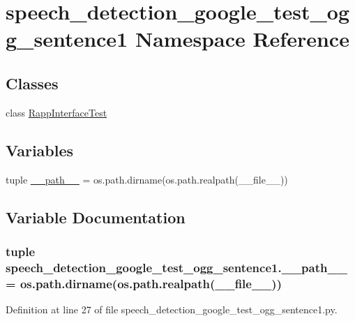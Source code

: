 \hypertarget{namespacespeech__detection__google__test__ogg__sentence1}{\section{speech\-\_\-detection\-\_\-google\-\_\-test\-\_\-ogg\-\_\-sentence1 Namespace Reference}
\label{namespacespeech__detection__google__test__ogg__sentence1}
}
\subsection*{Classes}
\begin{DoxyCompactItemize}
\item 
class \hyperlink{classspeech__detection__google__test__ogg__sentence1_1_1RappInterfaceTest}{Rapp\-Interface\-Test}
\end{DoxyCompactItemize}
\subsection*{Variables}
\begin{DoxyCompactItemize}
\item 
tuple \hyperlink{namespacespeech__detection__google__test__ogg__sentence1_adbcb2ee4bd8d36ad6cdb101587e446a4}{\-\_\-\-\_\-path\-\_\-\-\_\-} = os.\-path.\-dirname(os.\-path.\-realpath(\-\_\-\-\_\-file\-\_\-\-\_\-))
\end{DoxyCompactItemize}


\subsection{Variable Documentation}
\hypertarget{namespacespeech__detection__google__test__ogg__sentence1_adbcb2ee4bd8d36ad6cdb101587e446a4}{
\subsubsection[{\-\_\-\-\_\-path\-\_\-\-\_\-}]{\setlength{\rightskip}{0pt plus 5cm}tuple speech\-\_\-detection\-\_\-google\-\_\-test\-\_\-ogg\-\_\-sentence1.\-\_\-\-\_\-path\-\_\-\-\_\- = os.\-path.\-dirname(os.\-path.\-realpath(\-\_\-\-\_\-file\-\_\-\-\_\-))}}\label{namespacespeech__detection__google__test__ogg__sentence1_adbcb2ee4bd8d36ad6cdb101587e446a4}


Definition at line 27 of file speech\-\_\-detection\-\_\-google\-\_\-test\-\_\-ogg\-\_\-sentence1.\-py.

